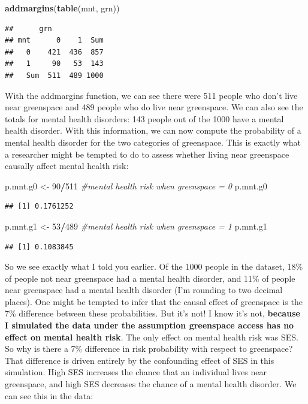 \documentclass[
]{book}
\newenvironment{Shaded}{\begin{snugshade}}{\end{snugshade}}
\newcommand{\CommentTok}[1]{\textcolor[rgb]{0.56,0.35,0.01}{\textit{#1}}}
\newcommand{\DecValTok}[1]{\textcolor[rgb]{0.00,0.00,0.81}{#1}}
\newcommand{\FunctionTok}[1]{\textcolor[rgb]{0.13,0.29,0.53}{\textbf{#1}}}
\newcommand{\NormalTok}[1]{#1}
\newcommand{\OtherTok}[1]{\textcolor[rgb]{0.56,0.35,0.01}{#1}}
\newcommand{\SpecialCharTok}[1]{\textcolor[rgb]{0.81,0.36,0.00}{\textbf{#1}}}
\begin{document}
\begin{Shaded}
\begin{Highlighting}[]
\FunctionTok{addmargins}\NormalTok{(}\FunctionTok{table}\NormalTok{(mnt, grn))}
\end{Highlighting}
\end{Shaded}

\begin{verbatim}
##      grn
## mnt      0    1  Sum
##   0    421  436  857
##   1     90   53  143
##   Sum  511  489 1000
\end{verbatim}

With the addmargins function, we can see there were 511 people who don't live near greenspace and 489 people who do live near greenspace. We can also see the totals for mental health disorders: 143 people out of the 1000 have a mental health disorder. With this information, we can now compute the probability of a mental health disorder for the two categories of greenspace. This is exactly what a researcher might be tempted to do to assess whether living near greenspace causally affect mental health risk:

\begin{Shaded}
\begin{Highlighting}[]
\NormalTok{p.mnt.g0 }\OtherTok{\textless{}{-}} \DecValTok{90}\SpecialCharTok{/}\DecValTok{511} \CommentTok{\#mental health risk when greenspace = 0}
\NormalTok{p.mnt.g0}
\end{Highlighting}
\end{Shaded}

\begin{verbatim}
## [1] 0.1761252
\end{verbatim}

\begin{Shaded}
\begin{Highlighting}[]
\NormalTok{p.mnt.g1 }\OtherTok{\textless{}{-}} \DecValTok{53}\SpecialCharTok{/}\DecValTok{489} \CommentTok{\#mental health risk when greenspace = 1}
\NormalTok{p.mnt.g1}
\end{Highlighting}
\end{Shaded}

\begin{verbatim}
## [1] 0.1083845
\end{verbatim}

So we see exactly what I told you earlier. Of the 1000 people in the dataset, 18\% of people not near greenspace had a mental health disorder, and 11\% of people near greenspace had a mental health disorder (I'm rounding to two decimal places). One might be tempted to infer that the causal effect of greenspace is the 7\% difference between these probabilities. But it's not! I know it's not, \textbf{because I simulated the data under the assumption greenspace access has no effect on mental health risk}. The only effect on mental health risk was SES. So why is there a 7\% difference in risk probability with respect to greenspace? That difference is driven entirely by the confounding effect of SES in this simulation. High SES increases the chance that an individual lives near greenspace, and high SES decreases the chance of a mental health disorder. We can see this in the data:
\end{document}
